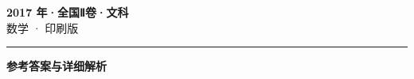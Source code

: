 \documentclass[zihao=5, a4paper]{ctexart}
\begin{document}
\begin{center}
  {\Large\bfseries 2017 年·全国Ⅱ卷·文科}\\[4pt]
  {\large 数学 · 印刷版}
\end{center}
\medskip
{}

\par\bigskip\hrule\bigskip
{}
\begin{center}{\large\bfseries 参考答案与详细解析}\end{center}
\smallskip

\end{document}

